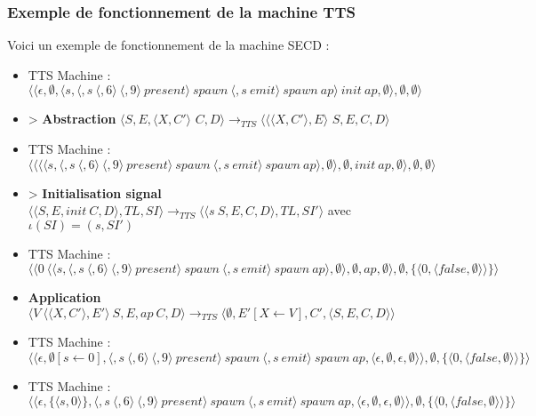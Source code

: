 \documentclass[10pt,a4paper]{report}
\begin{document}
\subsubsection{Exemple de fonctionnement de la machine TTS}\label{TTS}

Voici un exemple de fonctionnement de la machine SECD :	

\begin{itemize}
\item[] TTS Machine : $\langle\langle \epsilon,\emptyset,\langle s,\langle ,s~\langle,6\rangle~\langle,9\rangle~present\rangle~spawn~\langle ,s~emit\rangle~spawn~ap\rangle~init~ap,\emptyset\rangle,\emptyset,\emptyset\rangle$
\item[] > \textbf{Abstraction} 	$\langle S,E,\langle X,C'\rangle$ $C,D\rangle
  \longrightarrow_{TTS} 
  \langle \langle\langle X,C'\rangle,E\rangle$ $S,E,C,D\rangle$
\item[] TTS Machine : $\langle\langle \langle\langle s,\langle ,s~\langle,6\rangle~\langle,9\rangle~present\rangle~spawn~\langle ,s~emit\rangle~spawn~ap\rangle,\emptyset\rangle,\emptyset,init~ap,\emptyset\rangle,\emptyset,\emptyset\rangle$
\item[] > \textbf{Initialisation signal} $\langle\langle S,E,init~C,D\rangle,TL,SI\rangle 
  \longrightarrow_{TTS}
  \langle\langle s~S,E,C,D\rangle,TL,SI'\rangle$
  avec $\iota(SI) = (s,SI')$
\item[] TTS Machine : $\langle\langle 0~\langle\langle s,\langle ,s~\langle,6\rangle~\langle,9\rangle~present\rangle~spawn~\langle ,s~emit\rangle~spawn~ap\rangle,\emptyset\rangle,\emptyset,ap,\emptyset\rangle,\emptyset,\{\langle 0,\langle false,\emptyset\rangle\rangle\}\rangle$ 
\item[] \textbf{Application} $\langle V~\langle\langle X,C'\rangle,E'\rangle~S,E,ap~C,D\rangle
  \longrightarrow_{TTS} 
  \langle \emptyset,E'[X \leftarrow V],C',\langle S,E,C,D\rangle\rangle$
\item[] TTS Machine : $\langle\langle\epsilon,\emptyset[s \leftarrow 0],\langle ,s~\langle,6\rangle~\langle,9\rangle~present\rangle~spawn~\langle ,s~emit\rangle~spawn~ap,\langle \epsilon,\emptyset,\epsilon,\emptyset\rangle\rangle,\emptyset,\{\langle 0,\langle false,\emptyset\rangle\rangle\}\rangle$ 
\item[] TTS Machine : $\langle\langle\epsilon,\{\langle s,0\rangle\},\langle ,s~\langle,6\rangle~\langle,9\rangle~present\rangle~spawn~\langle ,s~emit\rangle~spawn~ap,\langle \epsilon,\emptyset,\epsilon,\emptyset\rangle\rangle,\emptyset,\{\langle 0,\langle false,\emptyset\rangle\rangle\}\rangle$ 

\end{itemize}
\end{document}
